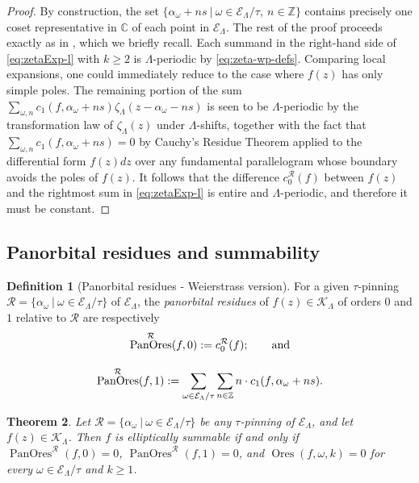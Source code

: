 \documentclass[preprint,12pt]{elsarticle}
\numberwithin{equation}{section} %
\theoremstyle{theorem}
\newtheorem{theorem}{Theorem}[section]
\theoremstyle{definition}
\newtheorem{definition}[theorem]{Definition}
\newcommand{\bk}{\mathcal{K}} %
\newcommand{\bkl}{\bk_{\Lambda}} %
\newcommand{\ec}{\mathcal{E}} %
\newcommand{\ecl}{\ec_{\Lambda}} %
\newcommand{\orbitl}{{\ecl/\tau}} %
\newcommand{\C}{\mathbb{C}} %
\newcommand{\zl}{\zeta_{\Lambda}}
\DeclareMathOperator{\ores}{Ores}
\DeclareMathOperator{\pano}{PanOres}
\begin{document}
\begin{proof}
    By construction, the set $\{\alpha_\omega+ns \ | \ \omega\in\orbitl, \ n\in\mathbb{Z}\}$ contains precisely one coset representative in $\C$ of each point in $\ecl$. The rest of the proof proceeds exactly as in \cite[pp.~449-450]{whittakerCourseModernAnalysis2006}, which we briefly recall. Each summand in the right-hand side of \eqref{eq:zetaExp-l} with $k\geq 2$ is $\Lambda$-periodic by \eqref{eq:zeta-wp-defs}. Comparing local expansions, one could immediately reduce to the case where $f(z)$ has only simple poles. The remaining portion of the sum \mbox{$\sum_{\omega,n}c_1(f,\alpha_\omega+ns)\zl(z-\alpha_\omega-ns)$} is seen to be $\Lambda$-periodic by the transformation law of $\zl(z)$ under $\Lambda$-shifts, together with the fact that $\sum_{\omega,n}c_1(f,\alpha_\omega+ns)=0$ by Cauchy's Residue Theorem applied to the differential form $f(z)dz$ over any fundamental parallelogram whose boundary avoids the poles of $f(z)$. It follows that the difference $c_0^\mathcal{R}(f)$ between $f(z)$ and the rightmost sum in \eqref{eq:zetaExp-l} is entire and $\Lambda$-periodic, and therefore it must be constant.
\end{proof}

\subsection{Panorbital residues and summability}

\begin{definition}[Panorbital residues - Weierstrass version] \label{def:pano-l} For a given \mbox{$\tau$-pinning} $\mathcal{R}=\{\alpha_\omega \ | \ \omega\in\orbitl\}$ of $\ecl$, the \emph{panorbital residues} of $f(z)\in\bkl$ of orders $0$ and $1$ relative to $\mathcal{R}$ are respectively
\begin{equation}\label{eq:pano-l-def}
    \begin{gathered}
        \pano^\mathcal{R}(f,0):=c_0^\mathcal{R}(f);\vphantom{\sum_A}\qquad \text{and}\\
    \pano^\mathcal{R}(f,1):=\sum_{\omega\in\orbitl}\sum_{n\in\mathbb{Z}} n\cdot c_1(f,\alpha_\omega+ns).
    \end{gathered}
\end{equation}
\end{definition}

\begin{theorem}\label{thm:mainl} Let $\mathcal{R}=\{\alpha_\omega \ | \ \omega\in\orbitl\}$ be any $\tau$-pinning of $\ecl$, and let $f(z)\in\bkl$. Then $f$ is elliptically summable if and only if $\pano^\mathcal{R}(f,0)=0$, $\pano^\mathcal{R}(f,1)=0$, and $\ores(f,\omega,k)=0$ for every $\omega\in\orbitl$ and $k\geq 1$.
\end{theorem}
\end{document}
